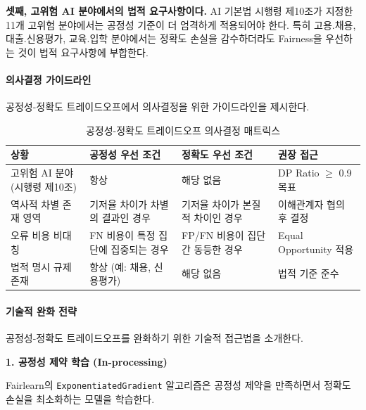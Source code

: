 \textbf{셋째, 고위험 AI 분야에서의 법적 요구사항이다.} 
AI 기본법 시행령 제10조가 지정한 11개 고위험 분야에서는 
공정성 기준이 더 엄격하게 적용되어야 한다. 
특히 고용.채용, 대출.신용평가, 교육.입학 분야에서는 
정확도 손실을 감수하더라도 Fairness을 우선하는 것이 법적 요구사항에 부합한다.


\paragraph{의사결정 가이드라인}

공정성-정확도 트레이드오프에서 의사결정을 위한 가이드라인을 제시한다.

\begin{table}[htbp]
\centering
\caption{공정성-정확도 트레이드오프 의사결정 매트릭스}
\label{tab:fairness_accuracy_matrix}
\begin{tabular}{p{3cm}p{4cm}p{4cm}p{3cm}}
\toprule
\textbf{상황} & \textbf{공정성 우선 조건} & \textbf{정확도 우선 조건} & \textbf{권장 접근} \\
\midrule
고위험 AI 분야 (시행령 제10조) & 
항상 & 
해당 없음 & 
DP Ratio $\geq$ 0.9 목표 \\
\midrule
역사적 차별 존재 영역 & 
기저율 차이가 차별의 결과인 경우 & 
기저율 차이가 본질적 차이인 경우 & 
이해관계자 협의 후 결정 \\
\midrule
오류 비용 비대칭 & 
FN 비용이 특정 집단에 집중되는 경우 & 
FP/FN 비용이 집단 간 동등한 경우 & 
Equal Opportunity 적용 \\
\midrule
법적 명시 규제 존재 & 
항상 (예: 채용, 신용평가) & 
해당 없음 & 
법적 기준 준수 \\
\bottomrule
\end{tabular}
\end{table}


\paragraph{기술적 완화 전략}

공정성-정확도 트레이드오프를 완화하기 위한 기술적 접근법을 소개한다.

\textbf{1. 공정성 제약 학습 (In-processing)}

Fairlearn\cite{bellamy2019ai}의 \texttt{ExponentiatedGradient} 알고리즘은 
공정성 제약을 만족하면서 정확도 손실을 최소화하는 모델을 학습한다.

